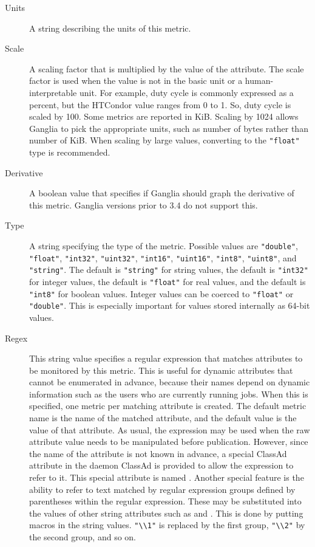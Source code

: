 \begin{description}
  \item[Units] A string describing the units of this metric.

  \item[Scale] A scaling factor that is multiplied by the value of the
     attribute.
    The scale factor is used when the value is not in the basic unit
    or a human-interpretable unit. For example, duty cycle is commonly
    expressed as a percent, but the HTCondor value ranges from 0 to 1.
    So, duty cycle is scaled by 100. Some metrics are reported in KiB.
    Scaling by 1024 allows Ganglia to pick the appropriate units,
    such as number of bytes rather than number of KiB. 
    When scaling by large values, converting to
    the \verb|"float"| type is recommended.

  \item[Derivative] A boolean value that specifies if Ganglia should
    graph the derivative of this metric.  Ganglia versions prior to
    3.4 do not support this.

  \item[Type] A string specifying the type of the metric.  Possible
    values are \verb|"double"|, \verb|"float"|, \verb|"int32"|,
    \verb|"uint32"|, \verb|"int16"|, \verb|"uint16"|,
    \verb|"int8"|, \verb|"uint8"|, and \verb|"string"|.
    The default is \verb|"string"| for string values,
    the default is \verb|"int32"| for integer values,
    the default is \verb|"float"| for real values,
    and the default is \verb|"int8"| for boolean values.
    Integer values can be coerced to \verb|"float"| or \verb|"double"|.
    This is especially important for values stored internally as 64-bit
    values.

  \item[Regex] This string value specifies a regular expression that
    matches attributes to be monitored by this metric.  This is useful
    for dynamic attributes that cannot be enumerated in advance,
    because their names depend on dynamic information such as the
    users who are currently running jobs.  When this is specified, one
    metric per matching attribute is created.  The default metric name
    is the name of the matched attribute, and the default value is the
    value of that attribute.  As usual, the  expression
    may be used when the raw attribute value needs to be manipulated
    before publication.  However, since the name of the attribute is
    not known in advance, a special ClassAd attribute in the daemon ClassAd
    is provided to allow the  expression to refer to it.
    This special attribute is named .  Another special
    feature is the ability to refer to text matched by regular
    expression groups defined by parentheses within the regular
    expression.  These may be substituted into the values of other
    string attributes such as  and .  This is
    done by putting macros in the string values.  \verb|"\\1"| is
    replaced by the first group, \verb|"\\2"| by the second group, and
    so on.


\end{description}
